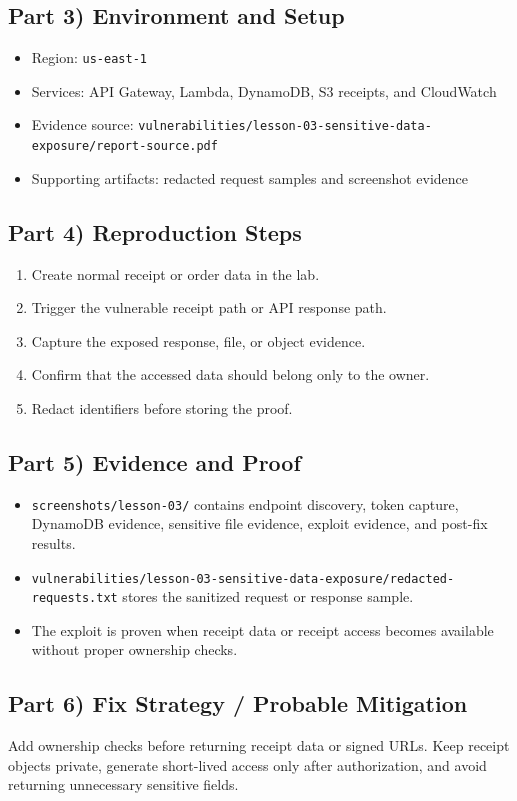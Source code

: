 \documentclass[12pt]{article}
\begin{document}
\subsection*{Part 3) Environment and Setup}
\begin{itemize}
\item Region: \texttt{us-east-1}
\item Services: API Gateway, Lambda, DynamoDB, S3 receipts, and CloudWatch
\item Evidence source: \texttt{vulnerabilities/lesson-03-sensitive-data-exposure/report-source.pdf}
\item Supporting artifacts: redacted request samples and screenshot evidence
\end{itemize}

\subsection*{Part 4) Reproduction Steps}
\begin{enumerate}
\item Create normal receipt or order data in the lab.
\item Trigger the vulnerable receipt path or API response path.
\item Capture the exposed response, file, or object evidence.
\item Confirm that the accessed data should belong only to the owner.
\item Redact identifiers before storing the proof.
\end{enumerate}

\subsection*{Part 5) Evidence and Proof}
\begin{itemize}
\item \texttt{screenshots/lesson-03/} contains endpoint discovery, token capture, DynamoDB evidence, sensitive file evidence, exploit evidence, and post-fix results.
\item \texttt{vulnerabilities/lesson-03-sensitive-data-exposure/redacted-requests.txt} stores the sanitized request or response sample.
\item The exploit is proven when receipt data or receipt access becomes available without proper ownership checks.
\end{itemize}

\subsection*{Part 6) Fix Strategy / Probable Mitigation}
Add ownership checks before returning receipt data or signed URLs. Keep receipt objects private, generate short-lived access only after authorization, and avoid returning unnecessary sensitive fields.
\end{document}
